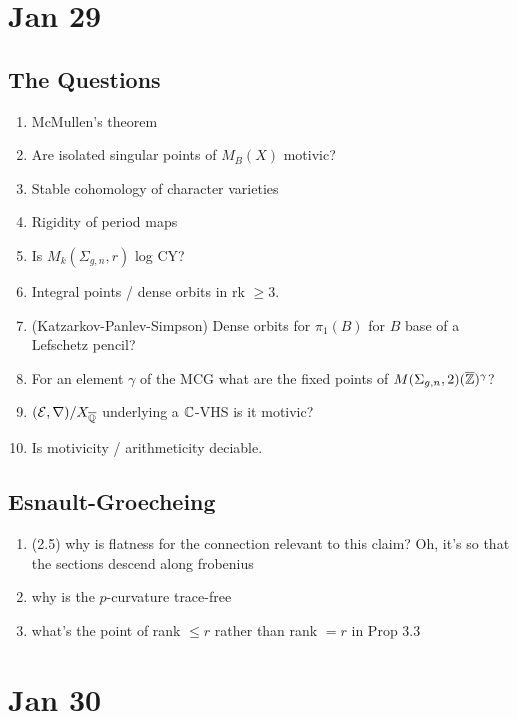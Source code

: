 \documentclass[12pt]{article}
\begin{document}
\section{Jan 29}

\subsection{The Questions}

\begin{enumerate}
\item McMullen's theorem
\item Are isolated singular points of $M_B(X)$ motivic?
\item Stable cohomology of character varieties
\item Rigidity of period maps
\item Is $M_k(\Sigma_{g,n}, r)$ log CY?
\item Integral points / dense orbits in rk $\ge 3$.
\item (Katzarkov-Panlev-Simpson) Dense orbits for $\pi_1(B)$ for $B$ base of a Lefschetz pencil?
\item For an element $\gamma$ of the MCG what are the fixed points of $M(\Sigma_{g,n}, 2)(\overline{\mathbb{Z}})^\gamma$?
\item $(\mathcal{E}, \nabla) / X_{\overline{\mathbb{Q}}}$ underlying a $\mathbb{C}$-VHS is it motivic?
\item Is motivicity / arithmeticity deciable.
\end{enumerate}


\subsection{Esnault-Groecheing}

\begin{enumerate}
\item (2.5) why is flatness for the connection relevant to this claim? Oh, it's so that the sections descend along frobenius
\item why is the $p$-curvature trace-free

\item what's the point of rank $\le r$ rather than rank $= r$ in Prop 3.3
\end{enumerate}


\section{Jan 30}

\newcommand{\V}{\mathbb{V}}
\newcommand{\Hdg}{\mathrm{Hodge}}
\newcommand{\W}{\mathbb{W}}
\newcommand{\cV}{\mathcal{V}}
\newcommand{\Higgs}{\mathrm{Higgs}}
\newcommand{\abs}{\mathrm{abs}}
\newcommand{\can}{\mathrm{can}}
\newcommand{\cris}{\mathrm{cris}}
\end{document}
